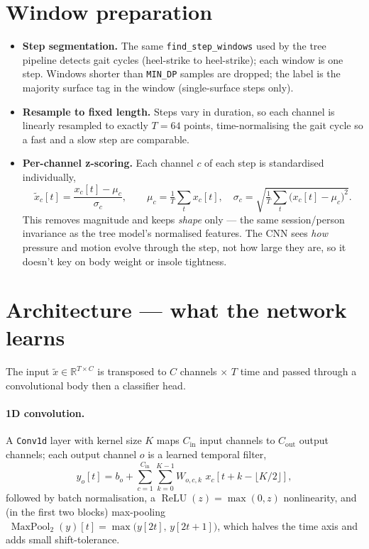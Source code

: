 \documentclass[11pt]{article}
\newcommand{\code}[1]{\texttt{#1}}
\begin{document}
\section{Window preparation}
\begin{itemize}
  \item \textbf{Step segmentation.} The same \code{find_step_windows} used by the tree pipeline
  detects gait cycles (heel-strike to heel-strike); each window is one step. Windows shorter than
  \code{MIN_DP} samples are dropped; the label is the majority surface tag in the window
  (single-surface steps only).
  \item \textbf{Resample to fixed length.} Steps vary in duration, so each channel is linearly
  resampled to exactly $T=64$ points, time-normalising the gait cycle so a fast and a slow step are
  comparable.
  \item \textbf{Per-channel z-scoring.} Each channel $c$ of each step is standardised individually,
  \begin{equation}
  \tilde x_c[t]=\frac{x_c[t]-\mu_c}{\sigma_c},\qquad
  \mu_c=\tfrac1T\textstyle\sum_t x_c[t],\quad
  \sigma_c=\sqrt{\tfrac1T\textstyle\sum_t\bigl(x_c[t]-\mu_c\bigr)^2}.
  \end{equation}
  This removes magnitude and keeps \emph{shape} only --- the same session/person invariance as the
  tree model's normalised features. The CNN sees \emph{how} pressure and motion evolve through the
  step, not how large they are, so it doesn't key on body weight or insole tightness.
\end{itemize}

\section{Architecture --- what the network learns}
The input $\tilde x\in\mathbb{R}^{T\times C}$ is transposed to $C$ channels $\times$ $T$ time and
passed through a convolutional body then a classifier head.

\paragraph{1D convolution.} A \code{Conv1d} layer with kernel size $K$ maps $C_{\text{in}}$ input
channels to $C_{\text{out}}$ output channels; each output channel $o$ is a learned temporal filter,
\begin{equation}
y_o[t]=b_o+\sum_{c=1}^{C_{\text{in}}}\sum_{k=0}^{K-1} W_{o,c,k}\,\, x_c\!\left[t+k-\lfloor K/2\rfloor\right],
\end{equation}
followed by batch normalisation, a $\operatorname{ReLU}(z)=\max(0,z)$ nonlinearity, and (in the
first two blocks) max-pooling $\;\operatorname{MaxPool}_2(y)[t]=\max\bigl(y[2t],\,y[2t{+}1]\bigr)$,
which halves the time axis and adds small shift-tolerance.
\end{document}

